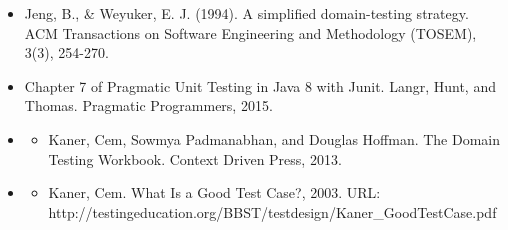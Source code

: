\begin{itemize}
\item
  Jeng, B., \& Weyuker, E. J. (1994). A simplified domain-testing
  strategy. ACM Transactions on Software Engineering and Methodology
  (TOSEM), 3(3), 254-270.
\item
  Chapter 7 of Pragmatic Unit Testing in Java 8 with Junit. Langr, Hunt,
  and Thomas. Pragmatic Programmers, 2015.
\item
  \begin{itemize}
  \tightlist
  \item
    Kaner, Cem, Sowmya Padmanabhan, and Douglas Hoffman. The Domain
    Testing Workbook. Context Driven Press, 2013.
  \end{itemize}
\item
  \begin{itemize}
  \tightlist
  \item
    Kaner, Cem. What Is a Good Test Case?, 2003. URL:
    http://testingeducation.org/BBST/testdesign/Kaner\_GoodTestCase.pdf
  \end{itemize}
\end{itemize}
